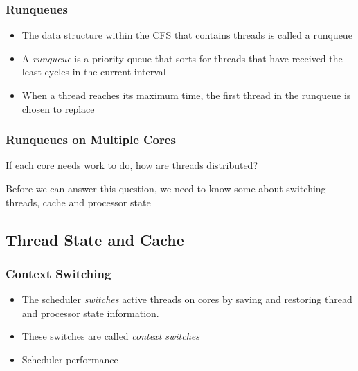 \documentclass{beamer}
\newcommand{\linespace}{\vskip 0.25cm}
\begin{document}
\begin{frame}
\frametitle{Runqueues}

\begin{itemize}
	\item The data structure within the CFS that contains threads is called a runqueue
	\item A \emph{runqueue} is a priority queue that sorts for threads that have received the least cycles in the current interval
	\item When a thread reaches its maximum time, the first thread in the runqueue is chosen to replace
\end{itemize}

\end{frame}




\begin{frame}
\frametitle{Runqueues on Multiple Cores}
If each core needs work to do, how are threads distributed?

\linespace

Before we can answer this question, we need to know some about switching threads, cache and processor state

\end{frame}



\subsection[Cache]{Thread State and Cache}

\begin{frame}
\frametitle{Context Switching}
\begin{itemize}
\item The scheduler \emph{switches} active threads on cores by saving and restoring thread and processor state information.
\item These switches are called \emph{context switches}
\item Scheduler performance 
\end{itemize}
\end{frame}
\end{document}
